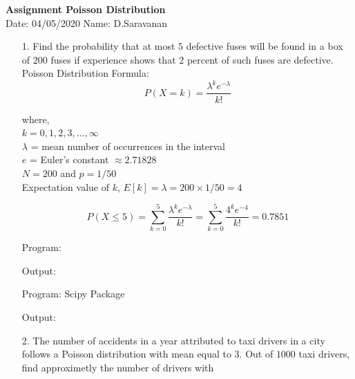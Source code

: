 \documentclass[a4paper,11pt,openright]{report}
\begin{document}
\singlespacing
\pagestyle{plain}

\begin{center}
\textbf{Assignment Poisson Distribution} \\
Date: 04/05/2020 \hspace{2mm} Name: D.Saravanan
\end{center}

\vspace{10px}

\begin{enumerate}

\item[1.] Find the probability that at most $5$ defective fuses will be found in a box of 
$200$ fuses if experience shows that $2$ percent of such fuses are defective. \\

Poisson Distribution Formula:
\begin{equation*}
P(X = k) = \frac{\lambda^{k} e^{-\lambda}}{k!}
\end{equation*}

where, \\
$k = 0, 1, 2, 3,..., \infty$\\
$\lambda$ = mean number of occurrences in the interval \\
$e$ = Euler's constant $\approx 2.71828$ \\


$N = 200$ and $p = 1/50$ \\
Expectation value of $k$, $E[k] = \lambda = 200 \times 1/50 = 4$



\begin{equation*}
P(X \leq 5)  = \sum_{k=0}^{5} \frac{\lambda^{k} e^{-\lambda}}{k!}
		     = \sum_{k=0}^{5} \frac{4^{k} e^{-4}}{k!}
			 = 0.7851
\end{equation*}

Program:

Output:


Program: Scipy Package

Output:


\vspace{1cm}

\item[2.] The number of accidents in a year attributed to taxi drivers in a city follows a
Poisson distribution with mean equal to $3$. Out of $1000$ taxi drivers, find approximetly
the number of drivers with \\


\end{enumerate}
\end{document}
